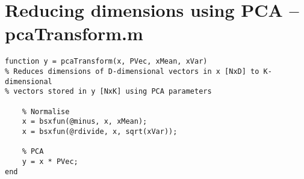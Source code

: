 \section{Reducing dimensions using PCA -- pcaTransform.m}
\label{sec:pcaTransform}
\begin{lstlisting}
function y = pcaTransform(x, PVec, xMean, xVar)
% Reduces dimensions of D-dimensional vectors in x [NxD] to K-dimensional
% vectors stored in y [NxK] using PCA parameters

    % Normalise
    x = bsxfun(@minus, x, xMean);
    x = bsxfun(@rdivide, x, sqrt(xVar));
    
    % PCA
    y = x * PVec;
end
\end{lstlisting}